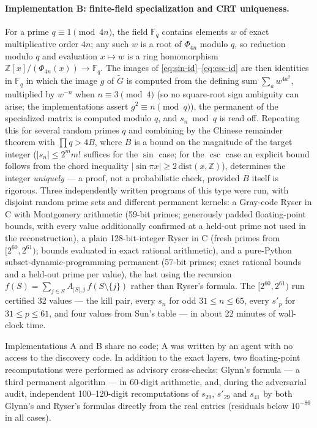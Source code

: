 \documentclass[10pt]{article}
\theoremstyle{remark}
\newcommand{\Z}{\mathbb{Z}}
\newcommand{\F}{\mathbb{F}}
\begin{document}
\paragraph{Implementation B: finite-field specialization and CRT
uniqueness.}
For a prime $q\equiv 1\pmod{4n}$, the field $\F_q$ contains elements $w$ of
exact multiplicative order $4n$; any such $w$ is a root of $\Phi_{4n}$
modulo $q$, so reduction modulo $q$ and evaluation $x\mapsto w$ is a ring
homomorphism $\Z[x]/(\Phi_{4n}(x))\to\F_q$. The images of
\eqref{eq:sin-id}--\eqref{eq:csc-id} are then identities in $\F_q$ in which
the image $g$ of $\widetilde G$ is computed from the defining sum $\sum_a
w^{4a^2}$, multiplied by $w^{-n}$ when $n\equiv 3\pmod 4$ (so no
square-root sign ambiguity can arise; the implementations assert
$g^2\equiv n \pmod q$), the permanent of the specialized matrix is computed
modulo $q$, and $s_n \bmod q$ is read off. Repeating this for several
random primes $q$ and combining by the Chinese remainder theorem with
$\prod q > 4B$, where $B$ is a bound on the magnitude of the
target integer ($|s_n|\le 2^m m!$ suffices for the $\sin$ case; for the
$\csc$ case an explicit bound follows from the chord inequality $|\sin \pi
x|\ge 2\,\mathrm{dist}(x,\Z)$), determines the integer \emph{uniquely}
--- a proof, not a probabilistic check, provided $B$ itself is rigorous.
Three independently written programs of this type were run, with disjoint
random prime sets and different permanent kernels: a Gray-code Ryser in C
with Montgomery arithmetic (59-bit primes; generously padded
floating-point bounds, with every value additionally confirmed at a
held-out prime not used in the reconstruction), a plain 128-bit-integer
Ryser in C (fresh primes from $[2^{60},2^{61})$; bounds evaluated in
exact rational arithmetic), and a pure-Python subset-dynamic-programming
permanent (57-bit primes; exact rational bounds and a held-out prime per
value), the last using the recursion
$f(S)=\sum_{j\in S}A_{|S|,j}\,f(S\setminus\{j\})$
rather than Ryser's formula. The $[2^{60},2^{61})$ run certified 32 values
--- the kill pair, every $s_n$ for odd $31\le n\le 65$, every $s'_p$ for
$31\le p\le 61$, and four values from Sun's table --- in about 22 minutes
of wall-clock time.

Implementations A and B share no code; A was written by an agent with no
access to the discovery code. In addition to the exact layers, two
floating-point recomputations were performed as advisory cross-checks:
Glynn's formula \cite{Glynn2010} --- a third permanent algorithm --- in
60-digit arithmetic, and, during the adversarial audit, independent
100--120-digit recomputations of $s_{29}$, $s'_{29}$ and $s_{41}$ by both
Glynn's and Ryser's formulas directly from the real entries (residuals
below $10^{-86}$ in all cases).
\end{document}
